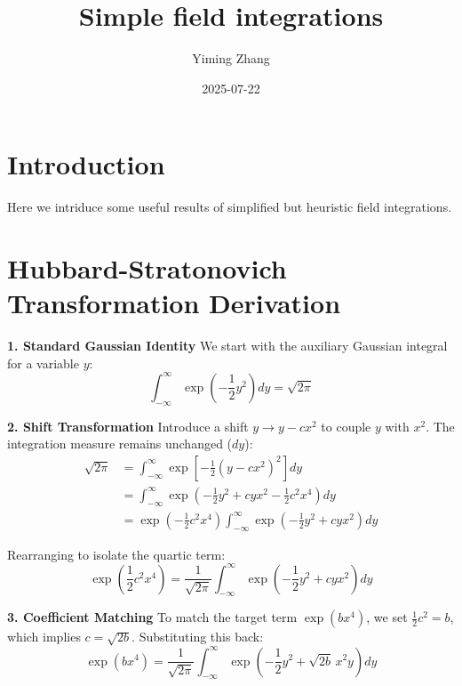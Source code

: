 \documentclass[14pt, a4paper]{extarticle}
\begin{document}
\title{Simple field integrations}
\author{Yiming Zhang}
\date{2025-07-22}

\maketitle

\section{Introduction}

Here we intriduce some useful results of simplified but heuristic field integrations.

\section*{Hubbard-Stratonovich Transformation Derivation}

\textbf{1. Standard Gaussian Identity}
We start with the auxiliary Gaussian integral for a variable $y$:
\begin{equation}
    \int_{-\infty}^{\infty} \exp\left(-\frac{1}{2}y^2\right) dy = \sqrt{2\pi}
\end{equation}

\textbf{2. Shift Transformation}
Introduce a shift $y \to y - cx^2$ to couple $y$ with $x^2$. The integration measure remains unchanged ($dy$):
\begin{equation}
\begin{aligned}
    \sqrt{2\pi} &= \int_{-\infty}^{\infty} \exp\left[-\frac{1}{2}(y - cx^2)^2\right] dy \\
    &= \int_{-\infty}^{\infty} \exp\left(-\frac{1}{2}y^2 + cyx^2 - \frac{1}{2}c^2 x^4\right) dy \\
    &= \exp\left(-\frac{1}{2}c^2 x^4\right) \int_{-\infty}^{\infty} \exp\left(-\frac{1}{2}y^2 + cyx^2\right) dy
\end{aligned}
\end{equation}

Rearranging to isolate the quartic term:
\begin{equation}
    \exp\left(\frac{1}{2}c^2 x^4\right) = \frac{1}{\sqrt{2\pi}} \int_{-\infty}^{\infty} \exp\left(-\frac{1}{2}y^2 + cyx^2\right) dy
\end{equation}

\textbf{3. Coefficient Matching}
To match the target term $\exp(bx^4)$, we set $\frac{1}{2}c^2 = b$, which implies $c = \sqrt{2b}$. Substituting this back:
\begin{equation}
    \exp(bx^4) = \frac{1}{\sqrt{2\pi}} \int_{-\infty}^{\infty} \exp\left(-\frac{1}{2}y^2 + \sqrt{2b}\,x^2 y\right) dy
\end{equation}
\end{document}

